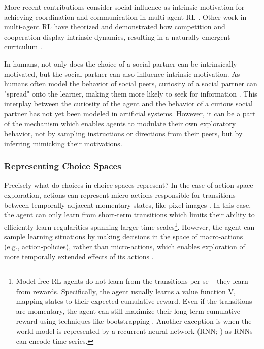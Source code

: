 More recent contributions consider social influence as intrinsic motivation for achieving coordination and communication in multi-agent RL \parencite{jaques_social_2019}. Other work in multi-agent RL have theorized and demonstrated how competition and cooperation display intrinsic dynamics, resulting in a naturally emergent curriculum \parencite{leibo_autocurricula_2019,baker_emergent_2020}.

In humans, not only does the choice of a social partner can be intrinsically motivated, but the social partner can also influence intrinsic motivation. As humans often model the behavior of social peers, curiosity of a social partner can "spread" onto the learner, making them more likely to seek for information \parencite{gordon_can_2015}. This interplay between the curiosity of the agent and the behavior of a curious social partner has not yet been modeled in artificial systems. However, it can be a part of the mechanism which enables agents to modulate their own exploratory behavior, not by sampling instructions or directions from their peers, but by inferring mimicking their motivations.

\subsubsection{Representing Choice Spaces}\label{CH3_SSS_representing_choice_spaces}
Precisely what do choices in choice spaces represent? In the case of action-space exploration, actions can represent micro-actions responsible for transitions between temporally adjacent momentary states, like pixel images \parencite[e.g.,][]{bellemare_unifying_2016,pathak_curiosity-driven_2017}. In this case, the agent can only learn from short-term transitions which limits their ability to efficiently learn regularities spanning larger time scales\footnote{Model-free RL agents \parencite[e.g.,][]{bellemare_unifying_2016,pathak_curiosity-driven_2017} do not learn from the transitions per se -- they learn from rewards. Specifically, the agent usually learns a value function V, mapping states to their expected cumulative reward. Even if the transitions are momentary, the agent can still maximize their long-term cumulative reward using techniques like bootstrapping \parencite{sutton2018reinforcement}. Another exception is when the world model is represented by a recurrent neural network (RNN; \cite{takahashi_dynamic_2017}) as RNNs can encode time series.}. However, the agent can sample learning situations by making decisions in the space of macro-actions (e.g., action-policies), rather than micro-actions, which enables exploration of more temporally extended effects of its actions \parencite[see][]{baranes_active_2013}. 

